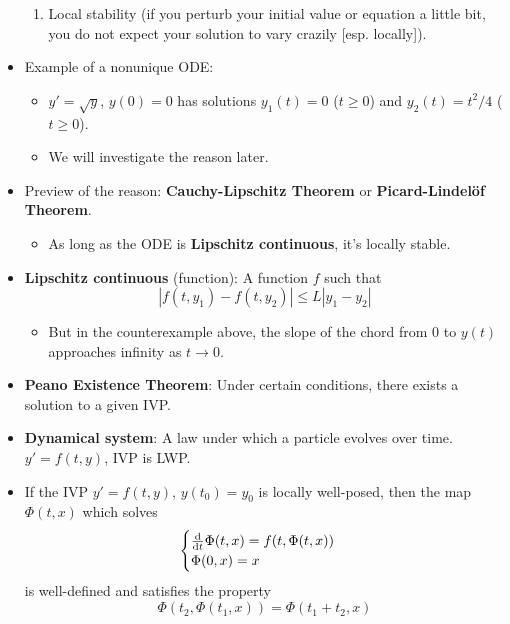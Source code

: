 \documentclass[../notes.tex]{subfiles}
\begin{document}
\begin{itemize}
\begin{enumerate}
        \item Local stability (if you perturb your initial value or equation a little bit, you do not expect your solution to vary crazily [esp. locally]).
    \end{enumerate}
    \item Example of a nonunique ODE:
    \begin{itemize}
        \item $y'=\sqrt{y}$, $y(0)=0$ has solutions $y_1(t)=0$ ($t\geq 0$) and $y_2(t)=t^2/4$ ($t\geq 0$).
        \item We will investigate the reason later.
    \end{itemize}
    \item Preview of the reason: \textbf{Cauchy-Lipschitz Theorem} or \textbf{Picard-Lindel\"{o}f Theorem}.
    \begin{itemize}
        \item As long as the ODE is \textbf{Lipschitz continuous}, it's locally stable.
    \end{itemize}
    \item \textbf{Lipschitz continuous} (function): A function $f$ such that
    \begin{equation*}
        |f(t,y_1)-f(t,y_2)| \leq L|y_1-y_2|
    \end{equation*}
    \begin{itemize}
        \item But in the counterexample above, the slope of the chord from 0 to $y(t)$ approaches infinity as $t\to 0$.
    \end{itemize}
    \item \textbf{Peano Existence Theorem}: Under certain conditions, there exists a solution to a given IVP.
    \item \textbf{Dynamical system}: A law under which a particle evolves over time. $y'=f(t,y)$, IVP is LWP.
    \item If the IVP $y'=f(t,y)$, $y(t_0)=y_0$ is locally well-posed, then the map $\Phi(t,x)$ which solves
    \begin{equation*}
        \begin{cases}
            \dv{t}\Phi(t,x) = f(t,\Phi(t,x))\\
            \Phi(0,x) = x
        \end{cases}
    \end{equation*}
    is well-defined and satisfies the property
    \begin{equation*}
        \Phi(t_2,\Phi(t_1,x)) = \Phi(t_1+t_2,x)

\end{equation*}
\end{itemize}
\end{document}
